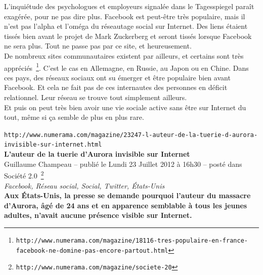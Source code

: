 \documentclass[11pt,twoside,a4paper]{article}
\begin{document}
L'inqui{\'e}tude des psychologues et employeurs signal{\'e}e dans le Tagesspiegel para{\^i}t exag{\'e}r{\'e}e, pour ne pas dire plus. Facebook est peut-{\^e}tre tr{\`e}s populaire, mais il n'est pas l'alpha et l'om{\'e}ga du r{\'e}seautage social sur Internet. Des liens {\'e}taient tiss{\'e}s bien avant le projet de Mark Zuckerberg et seront tiss{\'e}s lorsque Facebook ne sera plus. Tout ne passe pas par ce site, et heureusement.~\\

De nombreux sites communautaires existent par ailleurs, et certains sont tr{\`e}s appr{\'e}ci{\'e}s~\footnote{\texttt{http://www.numerama.com/magazine/18116-tres-populaire-en-france-facebook-ne-domine-pas-encore-partout.html}}. C'est le cas en Allemagne, en Russie, au Japon ou en Chine. Dans ces pays, des r{\'e}seaux sociaux ont su {\'e}merger et {\^e}tre populaire bien avant Facebook. Et cela ne fait pas de ces internautes des personnes en d{\'e}ficit relationnel. Leur r{\'e}seau se trouve tout simplement ailleurs.~\\

Et puis on peut tr{\`e}s bien avoir une vie sociale active sans {\^e}tre sur Internet du tout, m{\^e}me si \c{c}a semble de plus en plus rare.~\\

\clearpage

\texttt{http://www.numerama.com/magazine/23247-l-auteur-de-la-tuerie-d-aurora-invisible-sur-internet.html}~\\

\textbf{\LARGE L'auteur de la tuerie d'Aurora invisible sur Internet}~\\

Guillaume Champeau -- publi{\'e} le Lundi 23 Juillet 2012 {\`a} 16h30 -- post{\'e} dans Soci{\'e}t{\'e} 2.0~\footnote{\texttt{http://www.numerama.com/magazine/societe-20}}~\\

\emph{\small Facebook, R{\'e}seau social, Social, Twitter, {\'E}tats-Unis}~\\

\textbf{Aux {\'E}tats-Unis, la presse se demande pourquoi l'auteur du massacre d'Aurora, {\^a}g{\'e} de 24 ans et en apparence semblable {\`a} tous les jeunes adultes, n'avait aucune pr{\'e}sence visible sur Internet.}~\\
\end{document}
